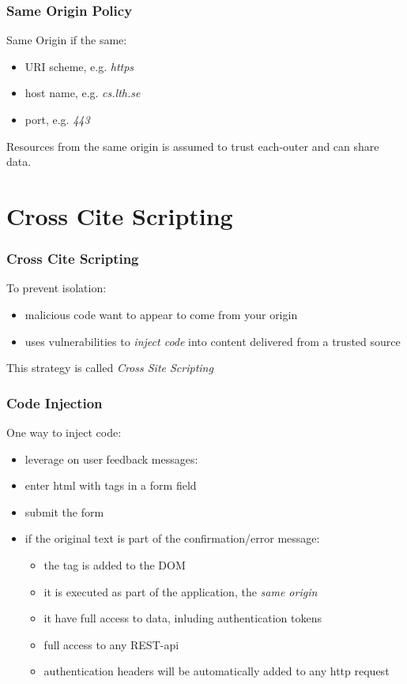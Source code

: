 \begin{frame}[fragile] \frametitle{Same Origin Policy}
Same Origin if the same:
\begin{itemize}
  \item URI scheme, e.g. \emph{https}
  \item host name, e.g. \emph{cs.lth.se}
  \item port, e.g. \emph{443}
\end{itemize}
\vspace{5mm}
Resources from the same origin is assumed to trust each-outer and can share data.
\end{frame}

\section{Cross Cite Scripting}
\begin{frame}[fragile] \frametitle{Cross Cite Scripting}
To prevent isolation:
\begin{itemize}
  \item malicious code want to appear to come from your origin
  \item uses vulnerabilities to \emph{inject code} into content delivered from a trusted source
\end{itemize}
\vspace{5mm}
This strategy is called \emph{Cross Site Scripting}
\end{frame}

\begin{frame}[fragile] \frametitle{Code Injection}
One way to inject code:
\begin{itemize}
  \item leverage on user feedback messages:
  \item enter html with  tags in a form field
  \item submit the form
  \item if the original text is part of the confirmation/error message:
  \begin{itemize}
    \item the  tag is added to the DOM
    \item it is executed as part of the application, the \emph{same origin}
    \item it have full access to data, inluding authentication tokens
    \item full access to any REST-api
    \item authentication headers will be automatically added to any http request
  \end{itemize}
\end{itemize}
\end{frame}

